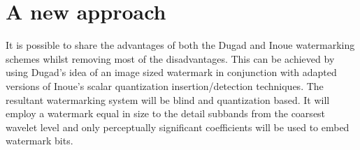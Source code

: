 \documentclass[10pt,twocolumn]{article}
\begin{document}
\section{A new approach}
It is possible to share the advantages of both the Dugad and Inoue watermarking schemes
whilst removing most of the disadvantages.
This can be achieved by using Dugad's idea of an image sized watermark in conjunction with
adapted versions of Inoue's scalar quantization insertion/detection techniques.
The resultant watermarking system will be blind and quantization based. It will 
employ a watermark equal in size to the detail subbands from the coarsest wavelet level
and only perceptually significant coefficients will be used to embed watermark bits.
\end{document}
